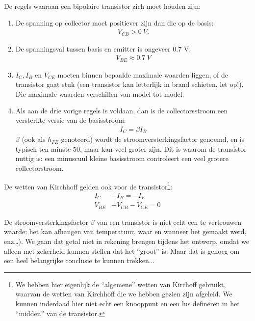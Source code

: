 \documentclass{article}
\begin{document}
				De regels waaraan een bipolaire transistor zich moet houden zijn:
				\begin{enumerate}
					\item De spanning op collector moet positiever zijn dan die op de basis: 
					\begin{align}
					    V_{CB} > 0~V. 
					\end{align}

					\item De spanningsval tussen basis en emitter is ongeveer $0.7$ V: 
					\begin{align}
					    V_{BE} \approx 0.7~V
					\end{align}

					\item $I_C, I_B$ en $V_{CE} $ moeten binnen bepaalde maximale waarden liggen, of de transistor gaat stuk (een transistor kan letterlijk in brand schieten, let op!). Die maximale waarden verschillen van model tot model.

					\item Als aan de drie vorige regels is voldaan, dan is de collectorsstroom een versterkte versie van de basisstroom: 
					\begin{align}
					    I_C = \beta I_B
					    \label{eq:hfe}
					\end{align}
					$\beta$ (ook als $h_{FE}$ genoteerd) wordt de stroomversterkingsfactor genoemd, en is typisch ten minste $50$, maar kan veel groter zijn. Dit is waarom de transistor nuttig is: een minuscuul kleine basisstroom controleert een veel grotere collectorstroom.

				\end{enumerate}

				De wetten van Kirchhoff gelden ook voor de transistor\footnote{We hebben hier eigenlijk de ``algemene'' wetten van Kirchoff gebruikt, waarvan de wetten van Kirchhoff die we hebben gezien zijn afgeleid. We kunnen inderdaad hier niet echt een knooppunt en een lus defin\"eren in het ``midden'' van de transistor.}:
				\begin{align}
				    I_C		&+ I_B = -I_E \\
				    V_{BE}  &+ V_{CB} - V_{CE} = 0
				\end{align}

				De stroomversterkingsfactor $\beta$ van een transistor is niet echt een te vertrouwen waarde: het kan afhangen van temperatuur, waar en wanneer het gemaakt werd, enz\ldots). We gaan dat getal niet in rekening brengen tijdens het ontwerp, omdat we alleen met zekerheid kunnen stellen dat het ``groot'' is. Maar dat is genoeg om een heel belangrijke conclusie te kunnen trekken...
\end{document}
